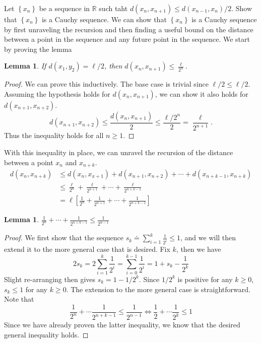\documentclass[10pt]{amsart}
\theoremstyle{plain}
\newtheorem{lemma}[equation]{Lemma}
\newenvironment{exercise}[1]{%
  \renewcommand\themanualtheoreminner{#1}%
  \manualtheoreminner
}{\endmanualtheoreminner}
\theoremstyle{definition}
\newcommand{\<}{\langle}
\renewcommand{\>}{\rangle}
\begin{document}
\begin{exercise}{1.15}
	Let $\left\{ x_n \right\}$ be a sequence in $\mathbb{R}$ such taht $d(x_n, x_{n+1}) \leq d(x_{n-1}, x_n)/2$. Show that $\left\{ x_n \right\}$ is a Cauchy sequence.
\end{exercise}
We can show that $\left\{ x_n \right\}$ is a Cauchy sequence by first unraveling the recursion and then finding a useful bound on the distance between a point in the sequence and any future point in the sequence. We start by proving the lemma
\begin{lemma}
	If $d(x_1,y_2) = \ell/2$, then $d(x_n, x_{n+1}) \leq \frac{\ell}{2^{n} } $.
\end{lemma}
\begin{proof}
	We can prove this inductively. The base case is trivial since $\ell/2 \leq \ell/2$. Assuming the hypothesis holds for $d(x_n, x_{n+1})$, we can show it also holds for $d(x_{n+1}, x_{n+2})$.
	\[
		d(x_{n+1}, x_{n+2}) \leq \frac{d(x_{n}, x_{n+1})}{2} \leq \frac{\ell / 2^{n}}{2} = \frac{\ell}{2^{n+1}}.
	\] 
Thus the inequality holds for all $n \geq 1$.
\end{proof}

With this inequality in place, we can unravel the recursion of the distance between a point $x_n$ and $x_{n+k}$.
\begin{align*}
	d(x_{n}, x_{n+k}) &\leq d(x_n, x_{x+1}) + d(x_{n+1}, x_{n+2}) + \cdots + d(x_{n+k-1}, x_{n+k}) \\
			  &\leq \frac{\ell}{2^{n}} + \frac{\ell}{2^{n+1}} + \cdots + \frac{\ell}{2^{n+k-1}} \\
			  &= \ell \left[ \frac{1}{2^{n}} + \frac{1}{2^{n+1}} + \cdots + \frac{1}{2^{n+k-1}} \right]
\end{align*} 

\begin{lemma}
	$\frac{1}{2^n} + \cdots + \frac{1}{2^{n+k-1}} \leq \frac{1}{2^{n-1}} $
\end{lemma}
\begin{proof}
	We first show that the sequence $s_k \doteq \sum_{i=1}^{k} \frac{1}{2^i} \leq 1$, and we will then extend it to the more general case that is desired. Fix $k$, then we have
	\[
		2 s_k = 2 \sum_{i=1}^{k} \frac{1}{2^i} = \sum_{i=0}^{k-1} \frac{1}{2^i} = 1 + s_k - \frac{1}{2^k} 
	\]
	Slight re-arranging then gives $s_k = 1 - 1/2^k $. Since $1/2^k$ is positive for any $k \geq 0$, $s_k \leq 1$ for any $k \geq 0$. The extension to the more general case is straightforward. Note that
	\[
	\frac{1}{2^n}  + \cdots \frac{1}{2^{n+k-1}} \leq \frac{1}{2^{n-1}} \iff \frac{1}{2}  + \cdots \frac{1}{2^{k}} \leq 1
	\] 
	Since we have already proven the latter inequality, we know that the desired general inequality holds.
\end{proof}
\end{document}
